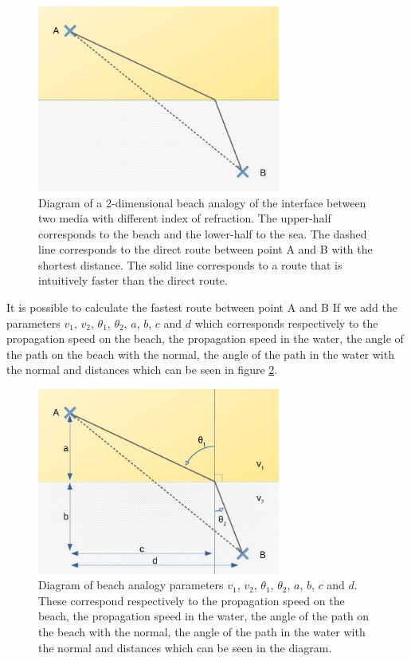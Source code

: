 \documentclass{article}
\begin{document}
\begin{figure}[h!]
	\centering
	\includegraphics[width=8cm]{afbeeldingen/snell_diagram_leeg.jpg}
	\caption{Diagram of a 2-dimensional beach analogy of the interface between two media with different index of refraction. The upper-half corresponds to the beach and the lower-half to the sea. The dashed line corresponds to the direct route between point A and B with the shortest distance. The solid line corresponds to a route that is intuitively faster than the direct route.}
	\label{fig_snell_empty}
\end{figure}

It is possible to calculate the fastest route between point A and B If we add the parameters $v_1$, $v_2$, $\theta _1$, $\theta _2$, $a$, $b$, $c$ and $d$ which corresponds respectively to the propagation speed on the beach, the propagation speed in the water, the angle of the path on the beach with the normal, the angle of the path in the water with the normal and distances which can be seen in figure \ref{fig_snell_full}.

\begin{figure}[h!]
	\centering
	\includegraphics[width=8cm]{afbeeldingen/snell_diagram_vol.jpg}
	\caption{Diagram of beach analogy parameters $v_1$, $v_2$, $\theta _1$, $\theta _2$, $a$, $b$, $c$ and $d$. These correspond respectively to the propagation speed on the beach, the propagation speed in the water, the angle of the path on the beach with the normal, the angle of the path in the water with the normal and distances which can be seen in the diagram.}
	\label{fig_snell_full}
\end{figure}
\end{document}
